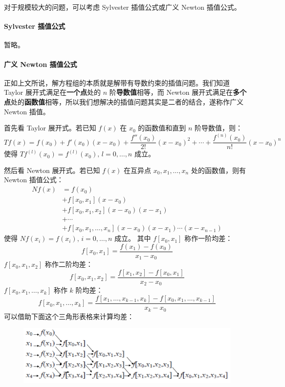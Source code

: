 对于规模较大的问题，可以考虑 Sylvester 插值公式或广义 Newton 插值公式。

\paragraph{Sylvester 插值公式} 暂略。

\paragraph{广义 Newton 插值公式}

正如上文所说，解方程组的本质就是解带有导数约束的插值问题。我们知道 Taylor 展开式满足在\textbf{一个点}处的 $n$ 阶\textbf{导数值}相等，而 Newton 展开式满足在\textbf{多个点}处的\textbf{函数值}相等，所以我们想解决的插值问题其实是二者的结合，遂称作广义 Newton 插值。

首先看 Taylor 展开式。若已知 $f(x)$ 在 $x_0$ 的函数值和直到 $n$ 阶导数值，则：
\[
    Tf(x)=f(x_0)+f'(x_0)(x-x_0)+\frac{f''(x_0)}{2!}(x-x_0)^2+\cdots+\frac{f^{(n)}(x_0)}{n!}(x-x_0)^n
\]
使得 $Tf^{(l)}(x_0)=f^{(l)}(x_0),\,l=0,\ldots,n$ 成立。

然后看 Newton 展开式。若已知 $f(x)$ 在互异点 $x_0,x_1,\ldots,x_n$ 处的函数值，则有 Newton 插值公式：
\begin{align*}
    Nf(x)&=f(x_0)\\
    &+f[x_0,x_1](x-x_0)\\
    &+f[x_0,x_1,x_2](x-x_0)(x-x_1)\\
    &+\cdots\\
    &+f[x_0,x_1,\ldots,x_n](x-x_0)(x-x_1)\cdots(x-x_{n-1})
\end{align*}
使得 $Nf(x_i)=f(x_i),\,i=0,\ldots,n$ 成立。
其中 $f[x_0,x_1]$ 称作一阶均差：
\[
    f[x_0,x_1]=\frac{f(x_1)-f(x_0)}{x_1-x_0}
\]
$f[x_0,x_1,x_2]$ 称作二阶均差：
\[
    f[x_0,x_1,x_2]=\frac{f[x_1,x_2]-f[x_0,x_1]}{x_2-x_0}
\]
$f[x_0,x_1,\ldots,x_k]$ 称作 $k$ 阶均差：
\[
    f[x_0,x_1,\ldots,x_k]=\frac{f[x_1,\ldots,x_{k-1},x_k]-f[x_0,x_1,\ldots,x_{k-1}]}{x_k-x_0}
\]
可以借助下面这个三角形表格来计算均差：
\begin{figure}[H]
    \centering
    \includegraphics[width=0.7\linewidth]{figs/diff.png}
\end{figure}

